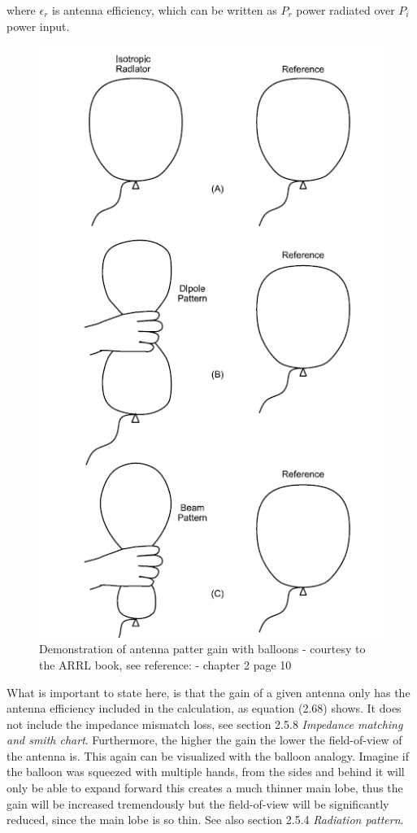 where $\epsilon_r$ is antenna efficiency, which can be written as $P_r$ power radiated over $P_i$ power input.

\begin{figure}[h]
\centering
\includegraphics[scale=0.8]{figures/BalloonDirectivity.PNG}
\caption{Demonstration of antenna patter gain with balloons - courtesy to the ARRL book, see reference: \cite{ARRL} - chapter 2 page 10}
\end{figure}

What is important to state here, is that the gain of a given antenna only has the antenna efficiency included in the calculation, as equation (2.68) shows. It does not include the impedance mismatch loss, see section 2.5.8 \textit{Impedance matching and smith chart}. Furthermore, the higher the gain the lower the field-of-view of the antenna is. This again can be visualized with the balloon analogy. Imagine if the balloon was squeezed with multiple hands, from the sides and behind it will only be able to expand forward this creates a much thinner main lobe, thus the gain will be increased tremendously but the field-of-view will be significantly reduced, since the main lobe is so thin. See also section 2.5.4 \textit{Radiation pattern}.   

